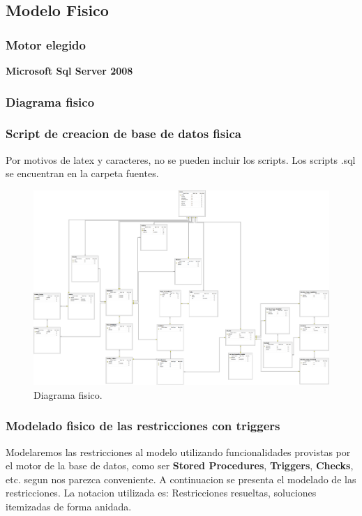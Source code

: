 \subsection{Modelo Fisico}
\subsubsection{Motor elegido}

\textbf{Microsoft Sql Server 2008}

\subsubsection{Diagrama fisico}
\subsubsection{Script de creacion de base de datos fisica}
Por motivos de latex y caracteres, no se pueden incluir los scripts. Los scripts .sql se encuentran en la carpeta fuentes.

\begin{landscape}
	\begin{figure}[t]
	  \centering	
		\includegraphics[scale=0.35]{fig/modelo-fisico.png}
	  \caption{Diagrama fisico.}
	\end{figure}
\end{landscape}

\subsubsection{Modelado fisico de las restricciones con triggers}
Modelaremos las restricciones al modelo utilizando funcionalidades provistas por el motor de la base de datos, como ser \textbf{Stored Procedures}, \textbf{Triggers}, \textbf{Checks}, etc. segun nos parezca conveniente. A continuacion se presenta el modelado de las restricciones. La notacion utilizada es: Restricciones resueltas, soluciones itemizadas de forma anidada. 

